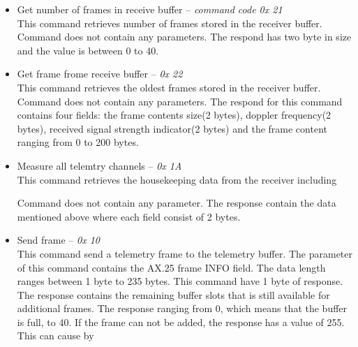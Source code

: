 \documentclass[a4paper]{article}
\begin{document}
\begin{itemize} 
    
    \item Get number of frames in receive buffer -- \textit{command code 0x 21}\\
    This command retrieves number of frames stored in the receiver buffer. Command does not contain any parameters. The respond has two byte in size and the value is between 0 to 40. 
    
    \item Get frame frome receive buffer -- \textit{0x 22}\\
    This command retrieves the oldest frames stored in the receiver buffer. Command does not contain any parameters. The respond for this command contains four fields: the frame contents size(2 bytes), doppler frequency(2 bytes), received signal strength indicator(2 bytes) and the frame content ranging from 0 to 200 bytes. 
    
    \item Measure all telemtry channels -- \textit{0x 1A}\\
    This command retrieves the housekeeping data from the receiver including 
     Command does not contain any parameter. The response contain the data mentioned above where each field consist of 2 bytes. 
    \item Send frame -- \textit{0x 10}\\
    This command send a telemetry frame to the telemetry buffer. The parameter of this command contains the AX.25 frame INFO field. The data length ranges between 1 byte to 235 bytes. This command have 1 byte of response. The response contains the remaining buffer slots that is still available for additional frames. The response ranging from 0, which means that the buffer is full, to 40. If the frame can not be added, the response has a value of 255. This can cause by     
    

\end{itemize}
\end{document}
